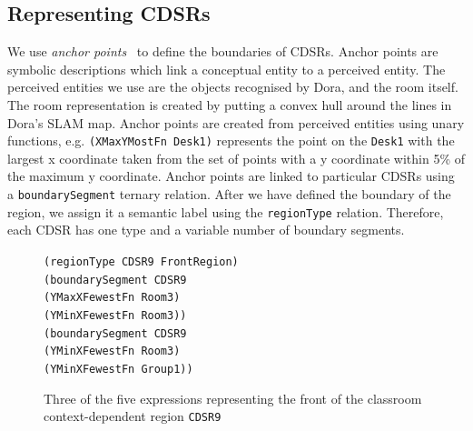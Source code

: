 \documentclass[letterpaper]{article}
\newcommand{\fw}[1]{\texttt{#1}}
\begin{document}


\subsection{Representing CDSRs}

We use \textit{anchor points}~\cite{Klenk/etal2005} to define the boundaries of CDSRs. Anchor points are symbolic descriptions which link a conceptual entity to a perceived entity. The perceived entities we use are the objects recognised by Dora, and the room itself. The room representation is created by putting a convex hull around the lines in Dora's SLAM map. Anchor points are created from perceived entities using unary functions, e.g. \fw{(XMaxYMostFn Desk1)} represents the point on the \fw{Desk1} with the largest x coordinate taken from the set of points with a y coordinate within 5\% of the maximum y coordinate. Anchor points are linked to particular CDSRs using a \fw{boundarySegment} ternary relation. After we have defined the boundary of the region, we assign it a semantic label using the \fw{regionType} relation. Therefore, each CDSR has one type and a variable number of boundary segments.

\begin{figure}[h]
	{\fontsize{8}{8} %

\fw{(regionType CDSR9 FrontRegion) \\
(boundarySegment CDSR9 \\
\hspace*{2em}(YMaxXFewestFn Room3) \\
\hspace*{2em}(YMinXFewestFn Room3)) \\
(boundarySegment CDSR9 \\
\hspace*{2em}(YMinXFewestFn Room3) \\
\hspace*{2em}(YMinXFewestFn Group1))
}
}
  \caption{Three of the five expressions representing the front of the classroom context-dependent region \fw{CDSR9}}
  \label{fig:cdsr-reps}
\end{figure}
\end{document}
